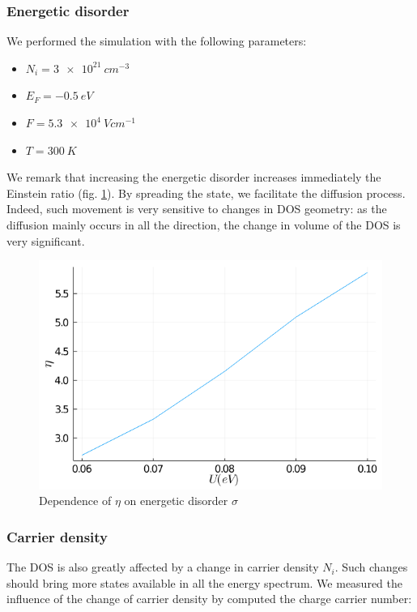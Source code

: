 \subsubsection{Energetic disorder}

We performed the simulation with the following parameters:

\begin{itemize}
    \item $N_i = \SI{3e21}{cm^{-3}}$
    \item $E_F = \SI{-0.5}{eV}$
    \item $F = \SI{5.3e4}{V cm^{-1}}$
    \item $T = \SI{300}{K}$
\end{itemize}

We remark that increasing the energetic disorder increases immediately the Einstein ratio (fig. \ref{fig:3_25}). By spreading the state, we facilitate the diffusion process. Indeed, such movement is very sensitive to changes in DOS geometry: as the diffusion mainly occurs in all the direction, the change in volume of the DOS is very significant.

\begin{figure}[!h]
    \centering
    \includegraphics*[width=.5\paperwidth]{figures/3_elec/eta_disorder.png}
    \caption{Dependence of $\eta$ on energetic disorder $\sigma$ \label{fig:3_25}}
\end{figure}

\subsubsection{Carrier density}

The DOS is also greatly affected by a change in carrier density $N_i$. Such changes should bring more states available in all the energy spectrum. We measured the influence of the change of carrier density by computed the charge carrier number:

